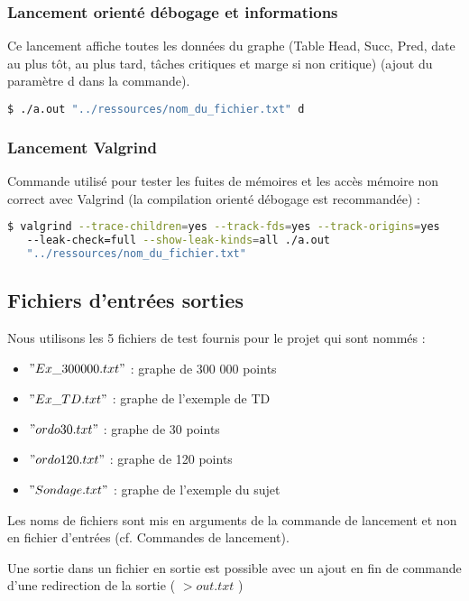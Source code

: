 \documentclass{article}
\begin{document}
\subsubsection{Lancement orienté débogage et informations}

Ce lancement affiche toutes les données du graphe (Table Head, Succ, Pred, date au plus tôt, au plus tard, tâches critiques et marge si non critique) (ajout du paramètre d dans la commande).

\begin{lstlisting}[language=bash]
 $ ./a.out "../ressources/nom_du_fichier.txt" d
\end{lstlisting}

\subsubsection{Lancement Valgrind}

Commande utilisé pour tester les fuites de mémoires et les accès mémoire non correct avec Valgrind (la compilation orienté débogage est recommandée) :
\begin{lstlisting}[language=bash]
 $ valgrind --trace-children=yes --track-fds=yes --track-origins=yes 
   --leak-check=full --show-leak-kinds=all ./a.out 
   "../ressources/nom_du_fichier.txt"
\end{lstlisting}

\subsection{Fichiers d'entrées sorties}

Nous utilisons les 5 fichiers de test fournis pour le projet qui sont nommés :
\begin{itemize}
\item $"Ex\_300000.txt"$ : graphe de 300 000 points
\item $"Ex\_TD.txt"$ : graphe de l'exemple de TD
\item $"ordo30.txt"$ : graphe de 30 points
\item $"ordo120.txt"$ : graphe de 120 points
\item $"Sondage.txt"$ : graphe de l'exemple du sujet
\end{itemize}

Les noms de fichiers sont mis en arguments de la commande de lancement et non en fichier d'entrées (cf. Commandes de lancement).

Une sortie dans un fichier en sortie est possible avec un ajout en fin de commande d'une redirection de la sortie ( $> out.txt$ )
\end{document}
